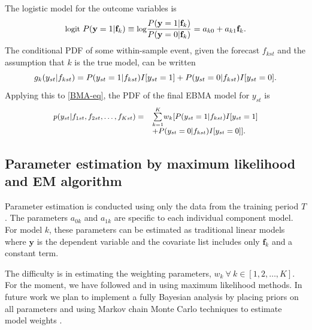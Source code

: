 \documentclass[12pt,fullpage]{article}
\begin{document}
The logistic model for the outcome variables is %
\begin{equation} \small
\label{one}
\mbox{logit } P(\mathbf{y}=1|\mathbf{f}_k) \equiv \mbox{log}\frac{P(\mathbf{y}=1|\mathbf{f}_k)}{P(\mathbf{y}=0|\mathbf{f}_k)} = a_{k0}+a_{k1}\mathbf{f}_k .
\end{equation}
\noindent The conditional PDF of some within-sample event, given the
forecast $f_{kst}$ and the assumption that $k$ is the true model, can
be written
\begin{equation} 
\label{component-eq}
\small
g_k(y_{st}|f_{kst}) = P(y_{st}=1|f_{kst})I[y_{st}=1]  + P(y_{st}=0|f_{kst})I[y_{st}=0].
\end{equation}
Applying this to \eqref{BMA-eq}, the PDF of the final EBMA model for
$y_{st}$ is
\begin{equation}
\label{pdf}
\small
\begin{array}{rl}
p(y_{st}|f_{1st}, f_{2st}, \ldots, f_{Kst}) = &
\overset{K}{\underset{k=1}{\sum}} w_k [
P(y_{st}=1|f_{kst})I[y_{st}=1] \\
& + P(y_{st}=0|f_{kst})I[y_{st}=0]].\end{array}
\end{equation}

\subsection{Parameter estimation by maximum likelihood and EM
algorithm}

Parameter estimation is conducted using only the data from the
training period $T$.  The parameters $a_{0k}$ and $a_{1k}$ are
specific to each individual component model.  For model $k$, these
parameters can be estimated as traditional linear models where
$\mathbf{y}$ is the dependent variable and the covariate list includes
only $\mathbf{f}_k$ and a constant term.

The difficulty is in estimating the weighting parameters,
$w_k~\forall~ k \in [1, 2, \dots, K]$. For the moment, we have
followed \citet{Raftery:2005} and \citet{Sloughter:2007} in using
maximum likelihood methods. In future work we plan to implement a
fully Bayesian analysis by placing priors on all parameters and using
Markov chain Monte Carlo techniques to estimate model weights
\citep[c.f.][]{Vrugt:2008}.
\end{document}
